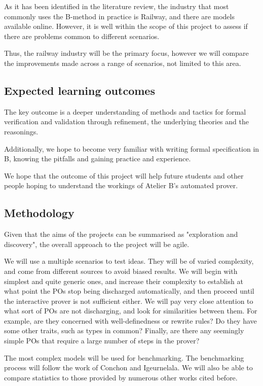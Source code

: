 \documentclass[11pt,journal]{IEEEtran}
\begin{document}
	As it has been identified in the literature review, the industry that most commonly uses the B-method in practice is Railway, and there are models available online\cite{Railway routing}. However, it is well within the scope of this project to assess if there are problems common to different scenarios.
	
	Thus, the railway industry will be the primary focus, however we will compare the improvements made across a range of scenarios, not limited to this area.
	
	\subsection{Expected learning outcomes}
	The key outcome is a deeper understanding of methods and tactics for formal verification and validation through refinement, the underlying theories and the reasonings. 
	
	Additionally, we hope to become very familiar with writing formal specification in B, knowing the pitfalls and gaining practice and experience.	
	
	We hope that the outcome of this project will help future students and other people hoping to understand the workings of Atelier B's automated prover.
		
	\subsection{Methodology}

	Given that the aims of the projects can be summarised as "exploration and discovery", the overall approach to the project will be agile. 
	
	We will use a multiple scenarios to test ideas. They will be of varied complexity, and come from different sources to avoid biased results. We will begin with simplest and quite generic ones, and increase their complexity to establish at what point the POs stop being discharged automatically, and then proceed until the interactive prover is not sufficient either. We will pay very close attention to what sort of POs are not discharging, and look for similarities between them. For example, are they concerned with well-definedness or rewrite rules? Do they have some other traits, such as types in common? Finally, are there any seemingly simple POs that require a large number of steps in the prover?
	
	The most complex models will be used for benchmarking. The benchmarking process will follow the work of Conchon and Igeurnelala\cite{survey}. We will also be able to compare statistics to those provided by numerous other works cited before.
	
\end{document}

